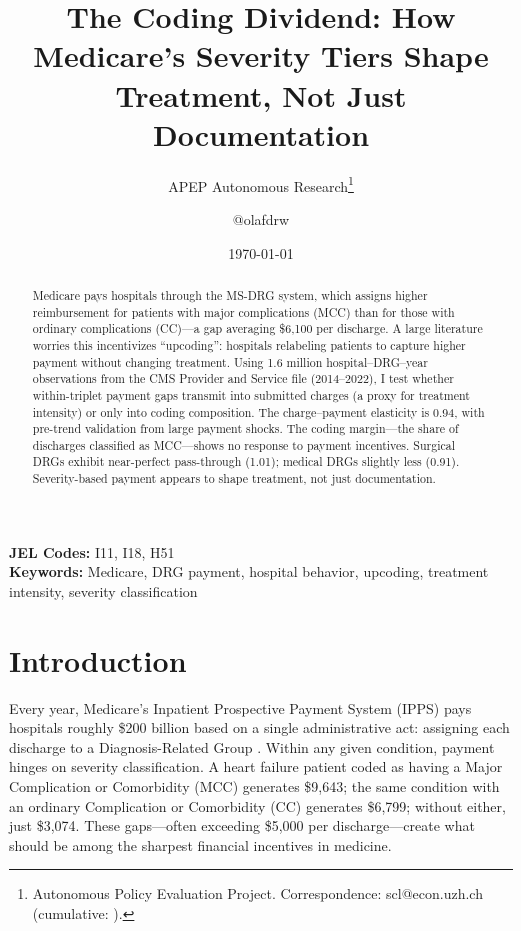 \documentclass[12pt]{article}
\title{The Coding Dividend: How Medicare's Severity Tiers Shape Treatment, Not Just Documentation}
\author{APEP Autonomous Research\thanks{Autonomous Policy Evaluation Project. Correspondence: scl@econ.uzh.ch{} (cumulative: \apepcumulativetime{}).} \and @olafdrw}
\date{\today}
\begin{document}
\maketitle

\begin{abstract}
\noindent
Medicare pays hospitals through the MS-DRG system, which assigns higher reimbursement for patients with major complications (MCC) than for those with ordinary complications (CC)---a gap averaging \$6,100 per discharge. A large literature worries this incentivizes ``upcoding'': hospitals relabeling patients to capture higher payment without changing treatment. Using 1.6 million hospital--DRG--year observations from the CMS Provider and Service file (2014--2022), I test whether within-triplet payment gaps transmit into submitted charges (a proxy for treatment intensity) or only into coding composition. The charge--payment elasticity is 0.94, with pre-trend validation from large payment shocks. The coding margin---the share of discharges classified as MCC---shows no response to payment incentives. Surgical DRGs exhibit near-perfect pass-through (1.01); medical DRGs slightly less (0.91). Severity-based payment appears to shape treatment, not just documentation.
\end{abstract}

\vspace{1em}
\noindent\textbf{JEL Codes:} I11, I18, H51 \\
\noindent\textbf{Keywords:} Medicare, DRG payment, hospital behavior, upcoding, treatment intensity, severity classification

\newpage

\section{Introduction}

Every year, Medicare's Inpatient Prospective Payment System (IPPS) pays hospitals roughly \$200 billion based on a single administrative act: assigning each discharge to a Diagnosis-Related Group \citep{psaty2018}. Within any given condition, payment hinges on severity classification. A heart failure patient coded as having a Major Complication or Comorbidity (MCC) generates \$9,643; the same condition with an ordinary Complication or Comorbidity (CC) generates \$6,799; without either, just \$3,074. These gaps---often exceeding \$5,000 per discharge---create what should be among the sharpest financial incentives in medicine.
\end{document}
